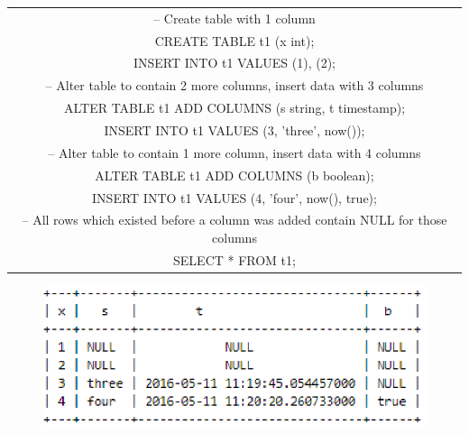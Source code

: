 \documentclass[onecolumn, draftclsnofoot,10pt, compsoc]{IEEEtran}
\begin{document}
\begin{center}
    \begin{tabular}{|c|}
    \hline
    -- Create table with 1 column \\
    CREATE TABLE t1 (x int); \\
    INSERT INTO t1 VALUES (1), (2); \\ 

    -- Alter table to contain 2 more columns, insert data with 3 columns \\ 
    ALTER TABLE  t1 ADD COLUMNS (s string, t timestamp); \\
    INSERT INTO t1 VALUES (3, 'three', now()); \\

    -- Alter table to contain 1 more column, insert data with 4 columns \\
    ALTER TABLE t1 ADD COLUMNS (b boolean); \\
    INSERT INTO t1 VALUES (4, 'four', now(), true); \\

    -- All rows which existed before a column was added contain NULL for those columns \\
    SELECT * FROM t1; \\
    \hline
    \end{tabular}
\end{center}
\begin{figure}[ht]
    \centering
    \includegraphics[keepaspectratio]{ili1.eps}
\end{figure}
\end{document}
